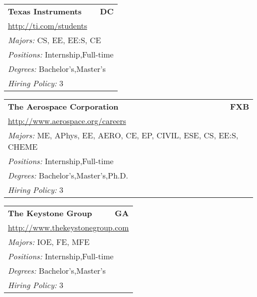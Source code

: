 \documentclass[twoside]{article}
\begin{document}
\begin{center}
\begin{multicols}{3}
\begin{FlushLeft}
\begin{minipage}{\columnwidth}
\end{minipage}
 
\begin{minipage}{\columnwidth}\begin{tabularx}{.95\columnwidth}{Xr}
                 {\Large\bf Texas Instruments} & {\Large\bf DC}\\
    \multicolumn{2}{p{.95\columnwidth}}{\url{http://ti.com/students}}\\
    \multicolumn{2}{p{.95\columnwidth}}{\emph{Majors:} CS, EE, EE:S, CE}\\
    \multicolumn{2}{p{.95\columnwidth}}{\emph{Positions:} Internship,Full-time}\\
    \multicolumn{2}{p{.95\columnwidth}}{\emph{Degrees:} Bachelor's,Master's}\\
    \multicolumn{2}{p{.95\columnwidth}}{\emph{Hiring Policy:} 3}\\
    \end{tabularx}
    
\end{minipage}
 
\begin{minipage}{\columnwidth}\begin{tabularx}{.95\columnwidth}{Xr}
                 {\Large\bf The Aerospace Corporation} & {\Large\bf FXB}\\
    \multicolumn{2}{p{.95\columnwidth}}{\url{http://www.aerospace.org/careers}}\\
    \multicolumn{2}{p{.95\columnwidth}}{\emph{Majors:} ME, APhys, EE, AERO, CE, EP, CIVIL, ESE, CS, EE:S, CHEME}\\
    \multicolumn{2}{p{.95\columnwidth}}{\emph{Positions:} Internship,Full-time}\\
    \multicolumn{2}{p{.95\columnwidth}}{\emph{Degrees:} Bachelor's,Master's,Ph.D.}\\
    \multicolumn{2}{p{.95\columnwidth}}{\emph{Hiring Policy:} 3}\\
    \end{tabularx}
    
\end{minipage}
 
\begin{minipage}{\columnwidth}\begin{tabularx}{.95\columnwidth}{Xr}
                 {\Large\bf The Keystone Group} & {\Large\bf GA}\\
    \multicolumn{2}{p{.95\columnwidth}}{\url{http://www.thekeystonegroup.com}}\\
    \multicolumn{2}{p{.95\columnwidth}}{\emph{Majors:} IOE, FE, MFE}\\
    \multicolumn{2}{p{.95\columnwidth}}{\emph{Positions:} Internship,Full-time}\\
    \multicolumn{2}{p{.95\columnwidth}}{\emph{Degrees:} Bachelor's,Master's}\\
    \multicolumn{2}{p{.95\columnwidth}}{\emph{Hiring Policy:} 3}\\
    \end{tabularx}
    

\end{minipage}
\end{FlushLeft}
\end{multicols}
\end{center}
\end{document}
